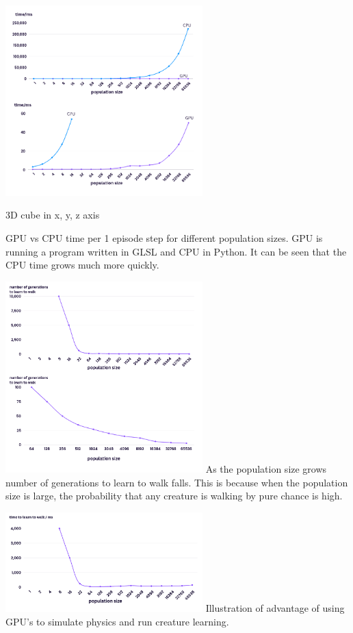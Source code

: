 
\includegraphics[width=3in]{popsizetime.png}
\caption{3D cube in x, y, z axis}
\label{fig:my_label}
GPU vs CPU time per 1 episode step for different population sizes. GPU is running a program written in GLSL and CPU in Python. It can be seen that the CPU time grows much more quickly.


\includegraphics[width=3in]{numberofgenerationstolearntowalk.png}
As the population size grows number of generations to learn to walk falls. This is because when the population size is large, the probability that any creature is walking by pure chance is high.

\includegraphics[width=3in]{resources/timetolearntowalk.png}
Illustration of advantage of using GPU's to simulate physics and run creature learning.

